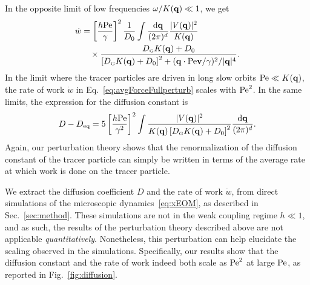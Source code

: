 \documentclass[pre, superscriptaddress, twocolumn,pre]{revtex4-1}
\newcommand{\dd}{\text{d}}
\begin{document}
In the opposite limit of low frequencies $\omega/K({\bf q}) \ll 1$, we get
\begin{equation}\label{eq:avgForceFullperturb}
	\begin{aligned}
		\dot w &= \left[\frac{h{\rm Pe}}{\gamma}\right]^2 \frac{1}{D_0} \int \frac{\dd{\bf q}}{(2\pi)^d} \frac{|V({\bf q})|^2}{K({\bf q})}
		\\
		&\quad \times \frac{D_\text{\tiny G} K({\bf q}) + D_0}{\left[D_\text{\tiny G} K({\bf q}) + D_0 \right]^2 + ({\bf q} \cdot {\rm Pe}{\bf v}/\gamma)^2 / |{\bf q}|^4} .
	\end{aligned}
\end{equation}
In the limit where the tracer particles are driven in long slow orbits ${\rm Pe}\ll K({\bf q})$, the rate of work $\dot w$ in Eq.~\eqref{eq:avgForceFullperturb} scales with ${\rm Pe}^2$. In the same limits, the expression for the diffusion constant is 
\begin{equation}
	D - D_{\rm eq} = 5 \left[\frac{h{\rm Pe}}{\gamma^2}\right]^2 \int \frac{ |V({\bf q})|^2 } { K({\bf q}) \left[ D_\text{\tiny G}  K({\bf q}) +  D_0 \right]^2} \frac{\dd{\bf q}}{(2\pi)^d} .
\end{equation}
Again, our perturbation theory shows that the renormalization of the diffusion constant of the tracer particle can simply be written in terms of the average rate at which work is done on the tracer particle. 


We extract the diffusion coefficient $D$ and the rate of work $\dot w$, from direct simulations of the microscopic dynamics~\eqref{eq:xEOM}, as described in Sec.~\ref{sec:method}. These simulations are not in the weak coupling regime $h \ll 1 $, and as such, the results of the perturbation theory described above are not applicable {\it quantitatively}. Nonetheless, this perturbation can help elucidate the scaling observed in the simulations. Specifically, our results show that the diffusion constant and the rate of work indeed both scale as ${\rm Pe}^2$ at large $\rm Pe$, as reported in Fig.~\ref{fig:diffusion}.
\end{document}
